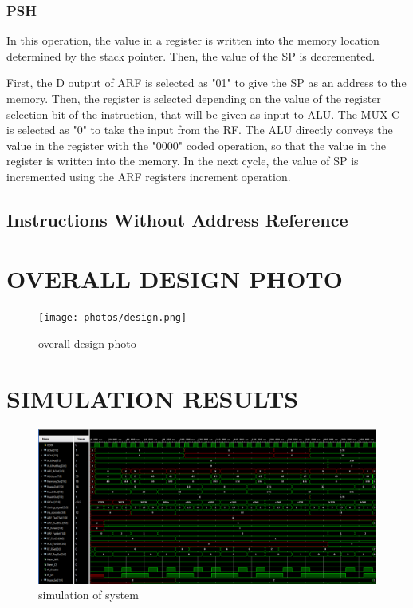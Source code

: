 \documentclass[pdftex,12pt,a4paper]{article}
\begin{document}
\subsubsection{PSH}
In this operation, the value in a register is written into the memory location determined by the stack pointer.
Then, the value of the SP is decremented.

First, the D output of ARF is selected as "01" to give the SP as an address to the memory. Then, the register is 
selected depending on the value of the register selection bit of the instruction, that will be given as input to ALU.
The MUX C is selected as "0" to take the input from the RF. The ALU directly conveys the value in the register with 
the "0000" coded operation, so that the value in the register is written into the memory. In the next cycle, the value 
of SP is incremented using the ARF registers increment operation.


\subsection{Instructions Without Address Reference}






\section{OVERALL DESIGN PHOTO}


\begin{figure}[H]
    \centering
    \texttt{[image: photos/design.png]}	
    \caption{overall design photo}
    \label{implementation}
\end{figure}








\section{SIMULATION RESULTS}


\begin{figure}[H]
    \centering
    \includegraphics[width=1\textwidth]{photos/system_result_1.png}	
    \caption{simulation of system}
    \label{implementation}
\end{figure}
\end{document}

